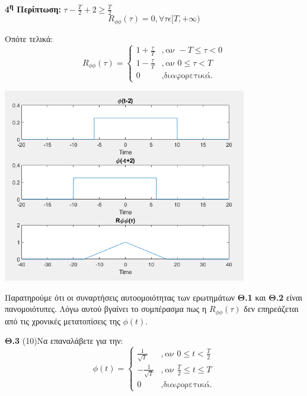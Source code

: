 \begin{justify}
{\bf 4\textsuperscript{η} Περίπτωση:}  $\tau-\frac{T}{2}+2\geq\frac{T}{2}$
\[
R_{\phi\phi}(\tau)=0, \forall \tau \epsilon [T,+\infty)      
\]
\end{justify}

\vspace{0.5cm}

\begin{justify}
Οπότε τελικά:
\[
R_{\phi\phi}(\tau)= 
\left\{
	\begin{array}{lll}
		1+\frac{\tau}{T} &, \mbox{αν } -T \leq \tau < 0 \\
        1-\frac{\tau}{T} &, \mbox{αν } 0 \leq \tau < T \\
		0 &, \mbox{διαφορετικά.}
	\end{array}
\right.
\]
\end{justify}

\begin{center}
    \centering
    \includegraphics[width=0.8\textwidth]{THETA/Images/theta.fig2.png} %
    \label{fig:third_image}
\end{center}


\begin{justify}
Παρατηρούμε ότι οι συναρτήσεις αυτοομοιότητας των ερωτημάτων {\bf Θ.1} και {\bf Θ.2} είναι πανομοιότυπες. Λόγω αυτού βγαίνει το συμπέρασμα πως η $R_{\phi\phi}(\tau)$ δεν επηρεάζεται από τις χρονικές μετατοπίσεις της $\phi(t)$.
\end{justify}

\newpage


\begin{justify}
{\bf  Θ.3} (10)Να επαναλάβετε για την:
\[
\phi(t)= 
\left\{
	\begin{array}{lll}
		\frac{1}{\sqrt{T}} &, \mbox{αν } 0 \leq t < \frac{T}{2} \\
        -\frac{1}{\sqrt{T}} &, \mbox{αν } \frac{T}{2} \leq t \leq T \\
		0 &, \mbox{διαφορετικά.}
	\end{array}
\right.
\]
\end{justify}

